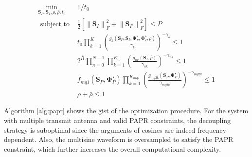 \begin{eqnarray}
  {\mathop {\min }\limits_{{{\mathbf{S}}_P},{{\mathbf{S}}_I},\rho ,\bar \rho ,{t_0}} }&{1/{t_0}} \label{eqn:papr_target} \\
  {{\text{ subject to }}}&{\frac{1}{2}\left[ {\left\| {{{\mathbf{S}}_I}} \right\|_F^2 + \left\| {{{\mathbf{S}}_P}} \right\|_F^2} \right] \leqslant P} \label{eqn:papr_power_constraint} \\
  {}&{{t_0}\prod\limits_{k = 1}^K {{{\left( {\frac{{{g_k}\left( {{{\mathbf{S}}_P},{{\mathbf{S}}_I},{\mathbf{\Phi }}_P^ \star ,{\mathbf{\Phi }}_I^ \star ,\rho } \right)}}{{{\gamma _k}}}} \right)}^{ - {\gamma _k}}}}  \leqslant 1} \label{eqn:papr_current_constraint} \\
  {}&{{2^{\bar R}}\prod\limits_{n = 0}^{N - 1} {\prod\limits_{k = 1}^{{K_n}} {{{\left( {\frac{{{g_{nk}}\left( {{{\mathbf{S}}_I},\bar \rho } \right)}}{{{\gamma _{nk}}}}} \right)}^{ - {\gamma _{nk}}}}} }  \leqslant 1} \label{eqn:papr_rate_constraint} \\
  {}&{{f_{mq1}}\left( {{{\mathbf{S}}_P},{\mathbf{\Phi }}_P^ \star } \right)\prod\limits_{k = 1}^{{K_{mq2}}} {{{\left( {\frac{{{g_{mq2k}}\left( {{{\mathbf{S}}_P},{\mathbf{\Phi }}_P^ \star } \right)}}{{{\gamma _{mq2k}}}}} \right)}^{ - {\gamma _{mq2k}}}}}  \leqslant 1} \label{eqn:papr_papr_constraint} \\
  {}&{\rho  + \bar \rho  \leqslant 1} \label{eqn:papr_ratio_constraint}
\end{eqnarray}

Algorithm \ref{alg:papr} shows the gist of the optimization procedure. For the system with multiple transmit antenna and valid PAPR constraints, the decoupling strategy is suboptimal since the arguments of cosines are indeed frequency-dependent. Also, the multisine waveform is oversampled to satisfy the PAPR constraint, which further increases the overall computational complexity.

